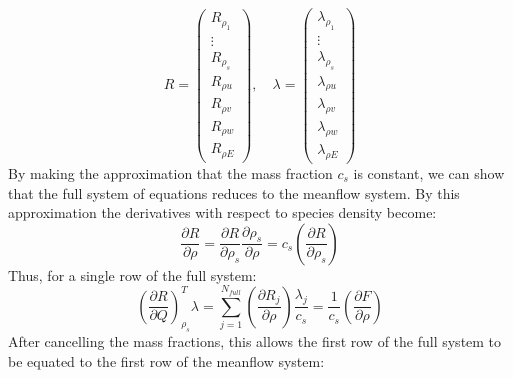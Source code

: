 \documentclass{article}   	%
\begin{document}
\begin{equation}
  R = \begin{pmatrix} 
        R_{\rho_1} \\ \vdots \\ R_{\rho_s} \\ R_{\rho u} \\
        R_{\rho v} \\ R_{\rho w} \\ R_{\rho E}
      \end{pmatrix}, \quad
      \lambda = \begin{pmatrix}
        \lambda_{\rho_1} \\ \vdots \\ \lambda_{\rho_s} \\
        \lambda_{\rho u} \\ \lambda_{\rho v} \\ \lambda_{\rho w} \\
        \lambda_{\rho E}
      \end{pmatrix}
  \label{full_sys}
\end{equation}
By making the approximation that the mass fraction $c_s$ is constant, we can show that the full system of equations reduces to the meanflow system.  By this approximation the derivatives with respect to species density become:
\begin{equation}
  \frac{\partial R}{\partial \rho} =
  \frac{\partial R}{\partial \rho_s} 
  \frac{\partial \rho_s}{\partial \rho} =
  c_s\left(\frac{\partial R}{\partial \rho_s}\right)
  \label{mass_frac_approx}
\end{equation}
Thus, for a single row of the full system:
\begin{equation}
  \left(\frac{\partial R}{\partial Q}\right)_{\rho_s}^T \lambda 
  = \sum_{j=1}^{N_{full}}{
    \left(\frac{\partial R_j}{\partial \rho}\right) \frac{\lambda_j}{c_s}}
    = \frac{1}{c_s}\left(\frac{\partial F}{\partial \rho}\right)
  \label{full_reduction}
\end{equation}
After cancelling the mass fractions, this allows the first row of the full system to be equated to the first row of the meanflow system:
\end{document}

